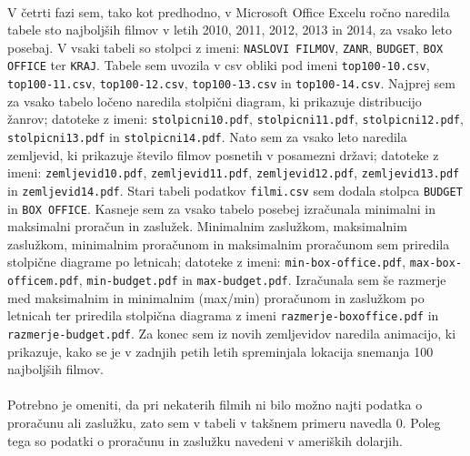 \documentclass[11pt,a4paper]{article}
\begin{document}
\paragraph{} V četrti fazi sem, tako kot predhodno, v Microsoft Office Excelu ročno naredila tabele sto najboljših filmov v letih 2010, 2011, 2012, 2013 in 2014, za vsako leto posebaj. V vsaki tabeli so stolpci z imeni: \verb|NASLOVI FILMOV|, \verb|ZANR|, \verb|BUDGET|, \verb|BOX OFFICE| ter \verb|KRAJ|. Tabele sem uvozila v csv obliki pod imeni \verb|top100-10.csv|, \verb|top100-11.csv|, \verb|top100-12.csv|, \verb|top100-13.csv| in \verb|top100-14.csv|. Najprej sem za vsako tabelo ločeno naredila stolpični diagram, ki prikazuje distribucijo žanrov; datoteke z imeni: \verb|stolpicni10.pdf|, \verb|stolpicni11.pdf|, \verb|stolpicni12.pdf|, \verb|stolpicni13.pdf| in \verb|stolpicni14.pdf|. Nato sem za vsako leto naredila zemljevid, ki prikazuje število filmov posnetih v posamezni državi; datoteke z imeni: \verb|zemljevid10.pdf|, \verb|zemljevid11.pdf|, \verb|zemljevid12.pdf|, \verb|zemljevid13.pdf| in \verb|zemljevid14.pdf|.
Stari tabeli podatkov \verb|filmi.csv| sem dodala stolpca \verb|BUDGET| in \verb|BOX OFFICE|. Kasneje sem za vsako tabelo posebej izračunala minimalni in maksimalni proračun in zaslužek. Minimalnim zaslužkom, maksimalnim zaslužkom, minimalnim proračunom in maksimalnim proračunom sem priredila stolpične diagrame po letnicah; datoteke z imeni: \verb|min-box-office.pdf|, \verb|max-box-officem.pdf|, \verb|min-budget.pdf| in \verb|max-budget.pdf|. Izračunala sem še razmerje med maksimalnim in minimalnim (max/min)  proračunom in zaslužkom po letnicah ter priredila stolpična diagrama z imeni \verb|razmerje-boxoffice.pdf| in \\ \verb|razmerje-budget.pdf|. Za konec sem iz novih zemljevidov naredila animacijo, ki prikazuje, kako se je v zadnjih petih letih spreminjala lokacija snemanja 100 najboljših filmov.

\paragraph{}Potrebno je omeniti, da pri nekaterih filmih ni bilo možno najti podatka o proračunu ali zaslužku, zato sem v tabeli v takšnem primeru navedla 0. Poleg tega so podatki o proračunu in zaslužku navedeni v ameriških dolarjih.
\end{document}

